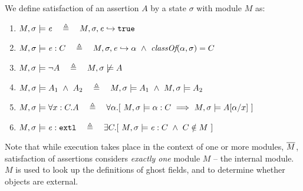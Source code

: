 \begin{definition} 
\label{def:chainmail-semantics}
We define satisfaction of an assertion $A$ by a %
state $\sigma$ with 
 module $M$ as:
\begin{enumerate}
\item
\label{cExpr}
$\satisfiesA{M}{\sigma}{{\re}}\ \ \ \triangleq \ \ \   \eval{M}{\sigma}{{\re}}{\true}$
\item
\label{cClass}
$M , \sigma \models {{\mathit{e}}} : C\ \ \ \triangleq \ \ \   M, \sigma, {\mathit{e}} \hookrightarrow \alpha\   \wedge \ \textit{classOf}(\alpha, \sigma)= C$
\item
$\satisfiesA{M}{\sigma}{\neg A}\ \ \ \triangleq \ \ \   {M},{\sigma}\not\models{A}$
\item
$\satisfiesA{M}{\sigma}{A_1\ \wedge\ A_2}\ \ \ \triangleq \ \ \   \satisfiesA{M}{\sigma}{A_1} \   \wedge \ \satisfiesA{M}{\sigma}{A_2}$

\item
\label{quant1}
$\satisfiesA{M}{\sigma}{\all{x:C}{A}} \ \ \ \triangleq \ \ \   
\forall \alpha.[\   \satisfiesA {M}{\sigma} {\alpha:C}  \ \Longrightarrow   \ \satisfiesA{M}{\sigma} {A[\alpha/x]} \ ] $

\item
\label{cExternal}
$\satisfiesA{M}{\sigma}{\external{{\re}}} \ \ \ \triangleq \ \ \  \exists C.[\ \satisfiesA{M}{\sigma}{{{\re}} : C} \ \wedge \ C \notin M \ ]$
\end{enumerate}
\end{definition}

 
Note that while execution takes place in the context of one or more modules, $\overline{M}$, satisfaction of assertions considers \emph{exactly one} module  $M$ -- the internal module. 
{$M$} is used  to look up the definitions of ghost fields, and to %
 determine whether objects are  external.

